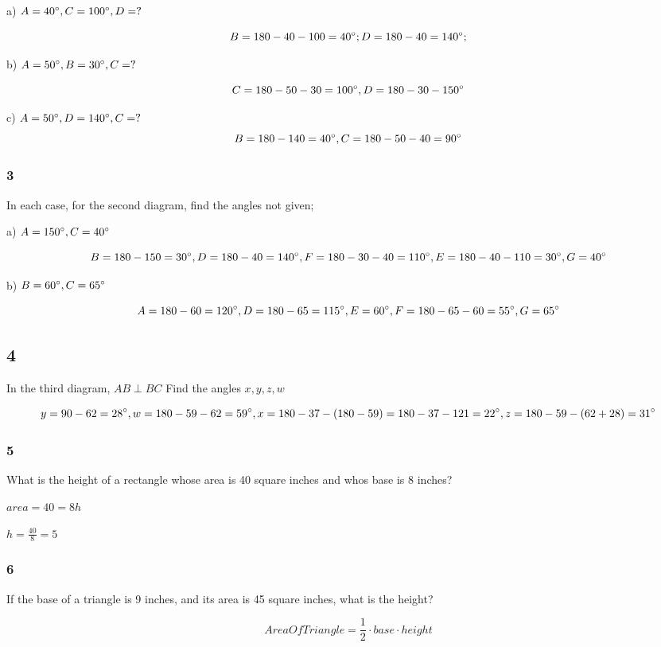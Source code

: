 \documentclass[]{report}
\begin{document}
a) $A=40\degree, C=100\degree, D=?$

\[
B = 180 - 40 - 100 = 40\degree; D = 180 - 40 = 140\degree;
\]

b) $A=50\degree, B=30\degree, C=?$

\[
C = 180 - 50 - 30 = 100\degree, D = 180 - 30 - 150\degree
\]

c) $A=50\degree, D=140\degree, C=?$
\[
B = 180 - 140 = 40\degree, C = 180 - 50 - 40 = 90\degree
\]


\subsubsection{3}

In each case, for the second diagram, find the angles not given;

a) $A=150\degree, C=40\degree$

\[
B = 180 - 150 = 30\degree, D = 180 - 40 = 140\degree, F = 180 - 30 - 40 = 110\degree, E=180-40-110=30\degree, G=40\degree
\]

b) $B=60\degree, C=65\degree$

\[
A = 180 - 60 = 120\degree, D=180-65=115\degree, E=60\degree, F=180-65-60 = 55\degree, G=65\degree
\]

\subsection{4}

In the third diagram, $AB \perp BC$ Find the angles $x, y, z, w$

\[
y=90-62=28\degree, w=180-59-62=59\degree, x=180-37-(180-59)=180-37-121=22\degree, z=180-59-(62+28)=31\degree 
\]

\subsubsection{5}
What is the height of a rectangle whose area is 40 square inches and whos base is 8 inches?

$area = 40 = 8h$

$h = \frac{40}{8}=5$

\subsubsection{6} 
If the base of a triangle is 9 inches, and its area is 45 square inches, what is the height?

\[
AreaOfTriangle=\frac{1}{2}\cdot base \cdot height
\]
\end{document}
